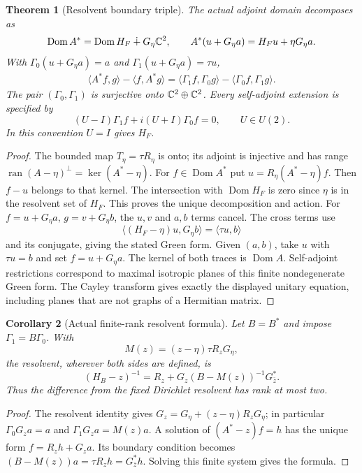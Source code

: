 \documentclass[11pt]{article}
\newtheorem{theorem}{Theorem}[section]
\newtheorem{corollary}[theorem]{Corollary}
\theoremstyle{remark}\newtheorem{remark}[theorem]{Remark}
\newcommand{\Dom}{\operatorname{Dom}}\newcommand{\dd}{\,d}
\begin{document}
\begin{theorem}[Resolvent boundary triple]\label{thm:triple}
The actual adjoint domain decomposes as
\[
 \Dom A^*=\Dom H_F\dotplus G_\eta\C^2,
 \qquad A^*(u+G_\eta a)=H_Fu+\eta G_\eta a.
\]
With $\Gamma_0(u+G_\eta a)=a$ and $\Gamma_1(u+G_\eta a)=\tau u$,
\begin{align*}
 \langle A^*f,g\rangle-\langle f,A^*g\rangle
 =\langle\Gamma_1f,\Gamma_0g\rangle
       -\langle\Gamma_0f,\Gamma_1g\rangle.
\end{align*}
The pair $(\Gamma_0,\Gamma_1)$ is surjective onto $\mathbb C^2\oplus\mathbb C^2$.
Every self-adjoint extension is specified by
\[
 (U-I)\Gamma_1f+i(U+I)\Gamma_0f=0,\qquad U\in U(2).
\]
In this convention $U=I$ gives $H_F$.
\end{theorem}
\begin{proof}
The bounded map $T_\eta=\tau R_\eta$ is onto; its adjoint is injective and
has range $\operatorname{ran}(A-\eta)^\perp=\ker(A^*-\eta)$.
For $f\in\Dom A^*$ put $u=R_\eta(A^*-\eta)f$. Then $f-u$ belongs to
that kernel. The intersection with $\Dom H_F$ is zero since $\eta$ is in
the resolvent set of $H_F$. This proves the unique decomposition and action.
For $f=u+G_\eta a$, $g=v+G_\eta b$, the $u,v$ and $a,b$ terms cancel.
The cross terms use
\[
 \langle(H_F-\eta)u,G_\eta b\rangle=\langle\tau u,b\rangle
\]
and its conjugate, giving the stated Green form. Given $(a,b)$, take $u$
with $\tau u=b$ and set $f=u+G_\eta a$. The kernel of both traces is
$\Dom A$. Self-adjoint restrictions correspond to maximal isotropic planes
of this finite nondegenerate Green form. The Cayley transform gives exactly
the displayed unitary equation, including planes that are not graphs of
a Hermitian matrix.
\end{proof}

\begin{corollary}[Actual finite-rank resolvent formula]\label{cor:resolvent}
Let $B=B^*$ and impose $\Gamma_1=B\Gamma_0$. With
\[
 M(z)=(z-\eta)\tau R_zG_\eta,
\]
the resolvent, wherever both sides are defined, is
\[
 (H_B-z)^{-1}=R_z+G_z(B-M(z))^{-1}G_{\bar z}^*.
\]
Thus the difference from the fixed Dirichlet resolvent has rank at most two.
\end{corollary}
\begin{proof}
The resolvent identity gives $G_z=G_\eta+(z-\eta)R_zG_\eta$;
in particular $\Gamma_0G_za=a$ and $\Gamma_1G_za=M(z)a$.
A solution of $(A^*-z)f=h$ has the unique form $f=R_zh+G_za$.
Its boundary condition becomes $(B-M(z))a=\tau R_zh=G_{\bar z}^*h$.
Solving this finite system gives the formula.
\end{proof}
\end{document}
